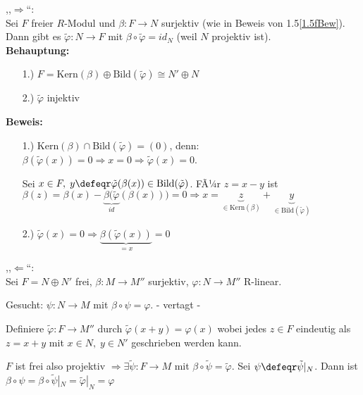 \begin{Bew}
  ,,$\Rightarrow$``:\\
  Sei $F$ freier $R$-Modul und $\beta: F \to N$ surjektiv (wie in Beweis von
  1.5\ref{1.5fBew}). Dann gibt es $\tilde{\varphi}: N \to F$ mit $\beta \circ
  \tilde{\varphi} = id_N$ (weil $N$ projektiv ist).\\
  \textbf{Behauptung:}
  \begin{enumerate}
    \item[1.)] $F = \mbox{Kern}(\beta) \oplus \mbox{Bild}(\tilde{\varphi}) \cong
               N' \oplus N$
    \item[2.)] $\tilde{\varphi}$ injektiv
  \end{enumerate}
  \textbf{Beweis:}
  \begin{enumerate}
    \item[1.)] Kern$(\beta) \cap \mbox{Bild}(\tilde{\varphi}) = (0)$, denn:
               $\beta(\tilde{\varphi}(x)) = 0 \Rightarrow x = 0 \Rightarrow
               \tilde{\varphi}(x) = 0$.
  
               Sei $x \in F,\; y \defeqr
               \tilde{\varphi}(\beta(x)) \in \mbox{Bild}(\tilde{\varphi})$.
               FÃ¼r $z = x - y$ ist $\beta(z) = \beta(x) -
               \underbrace{\beta(\tilde{\varphi}}_{id}(\beta(x)))= 0 \Rightarrow x = \underbrace{z}_{\in
               \textrm{Kern}(\beta)} + \underbrace{y}_{\in \textrm{Bild}(\tilde{\varphi})}$
    \item[2.)] $\tilde{\varphi}(x) = 0 \Rightarrow \underbrace{\beta(\tilde{\varphi}(x))}_{= x} = 0$
  \end{enumerate}
  ,,$\Leftarrow$``:\\
  Sei $F = N \oplus N'$ frei, $\beta: M \to M''$ surjektiv, $\varphi: N \to M''$
  R-linear.

  Gesucht: $\psi: N \to M$ mit $\beta \circ \psi = \varphi$. - vertagt -

  Definiere $\tilde{\varphi}: F \to M''$ durch $\tilde{\varphi}(x + y) =
  \varphi(x)$ wobei jedes $z \in F$ eindeutig als $z = x + y$ mit $x \in N,\; y
  \in N'$ geschrieben werden kann.

  $F$ ist frei also projektiv $\Rightarrow \exists \tilde{\psi}: F \to M$ mit
  $\beta \circ \tilde{\psi} = \tilde{\varphi}$. Sei $\psi \defeqr
  \tilde{\psi}|_N$. Dann ist $\beta \circ \psi = \beta \circ \tilde{\psi}|_N =
  \tilde{\varphi}|_N = \varphi$
\end{Bew}